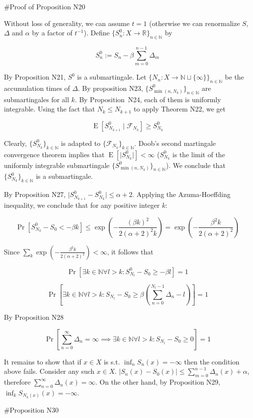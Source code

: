 \documentclass[a4paper]{article}
\DeclareMathOperator{\Prb}{Pr}
\DeclareMathOperator{\E}{E}
\newcommand{\Nats}{\mathbb{N}}
\newcommand{\Reals}{\mathbb{R}}
\newcommand{\Sq}[2]{\{#1\}_{#2 \in \Nats}}
\newcommand{\Sqn}[1]{\Sq{#1}{n}}
\newcommand{\Abs}[1]{\lvert #1 \rvert}
\newcommand{\F}{\mathcal{F}}
\begin{document}
\#Proof of Proposition N20

Without loss of generality, we can assume ${t = 1}$ (otherwise we can renormalize ${S}$, ${\Delta}$ and ${\alpha}$ by a factor of ${t^{-1}}$). Define ${\Sqn{S^0_n: X \rightarrow \Reals}}$ by

$$S^0_n := S_n - \beta \sum_{m=0}^{n-1} \Delta_m$$

By Proposition N21, ${S^0}$ is a submartingale. Let ${\Sqn{N_n:X \rightarrow \Nats \sqcup \{\infty\}}}$ be the accumulation times of ${\Delta}$. By proposition N23, ${\Sqn{S^0_{\min(n,N_k)}}}$ are submartingales for all ${k}$. By Proposition\ N24, each of them is uniformly integrable. Using the fact that ${N_{k} \leq N_{k+1}}$ to apply Theorem N22, we get

$$\E[S^0_{N_{k+1}} \mid \F_{N_k}] \geq S^0_{N_{k}}$$

Clearly, ${\Sq{S^0_{N_k}}{k}}$ is adapted to ${\Sq{\F_{N_k}}{k}}$. Doob's second martingale convergence theorem implies that ${\E[\Abs{S^0_{N_k}}] < \infty}$ (${S^0_{N_k}}$ is the limit of the uniformly integrable submartingale ${\Sqn{S^0_{\min(n,N_k)}}}$). We conclude that ${\Sq{S^0_{N_k}}{k}}$ is a submartingale.

By Proposition N27, ${\Abs{S^0_{N_{k+1}}-S^0_{N_k}}} \leq \alpha + 2$. Applying the Azuma-Hoeffding inequality, we conclude that for any positive integer ${k}$:

$$\Prb[S^0_{N_k} - S_0 < -\beta k] \leq \exp(-\frac{(\beta k)^2}{2(\alpha+2)^2 k})=\exp(-\frac{\beta^2 k}{2(\alpha+2)^2})$$

Since ${\sum_k \exp(-\frac{\beta^2 k}{2(\alpha+2)^2}) < \infty}$, it follows that

$$\Prb[\exists k \in \Nats \forall l > k: S^0_{N_l} - S_0 \geq -\beta l]=1$$

$$\Prb[\exists k \in \Nats \forall l > k: S_{N_l} - S_0 \geq \beta (\sum_{n=0}^{N_l-1} \Delta_n -  l)]=1$$

By Proposition N28

$$\Prb[\sum_{n=0}^\infty  \Delta_n = \infty \implies \exists k \in \Nats \forall l > k: S_{N_l} - S_0 \geq 0]=1$$

It remains to show that if ${x \in X}$ is s.t. ${\inf_n S_n(x) = -\infty}$ then the condition above fails. Consider any such ${x \in X}$. ${\Abs{S_n(x) - S_0(x)} \leq \sum_{m=0}^{n-1} \Delta_n(x) + \alpha}$, therefore ${\sum_{n=0}^\infty  \Delta_n(x) = \infty}$. On the other hand, by Proposition N29, ${\inf_{k} S_{N_k(x)}(x) = -\infty}$.
 
\#Proposition N30
\end{document}
